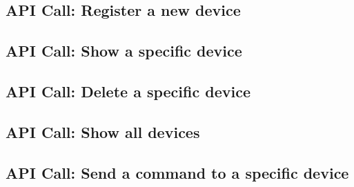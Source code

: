 \subsection{API Call: Register a new device}
\label{app:API_register_device}

\subsection{API Call: Show a specific device}
\label{app:API_get_device}

\subsection{API Call: Delete a specific device}
\label{app:API_delete_device}

\subsection{API Call: Show all devices}
\label{app:API_show_devices}

\subsection{API Call: Send a command to a specific device}
\label{app:API_dend_command}




%

